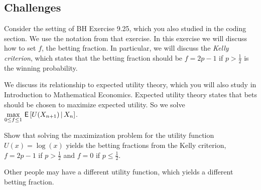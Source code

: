 \documentclass[assignments]{subfiles}
\begin{document}
\subsection{Challenges}

Consider the setting of BH Exercise 9.25, which you also studied in the coding section. We use the notation from that exercise.
In this exercise we will discuss how to set $f$, the betting fraction. In particular, we will discuss the \textit{Kelly criterion}, which states that the betting fraction should be $f = 2p-1$ if $p > \tfrac12$ is the winning probability.

We discuss its relationship to expected utility theory, which you will also study in Introduction to Mathematical Economics. Expected utility theory states that bets should be chosen to maximize expected utility. So we solve $\max\limits_{0 \leq f \leq 1} \,\mathsf{E}\left[U(X_{n+1}) \,\middle|\, X_n\right]$.




\begin{exercise}
Show that solving the maximization problem for the utility function $U(x) = \log(x)$ yields the betting fractions from the Kelly criterion, $f = 2p-1$ if $p > \tfrac12$ and $f=0$ if $p \leq \tfrac12$.

\end{exercise}

Other people may have a different utility function, which yields a different betting fraction.
\end{document}
